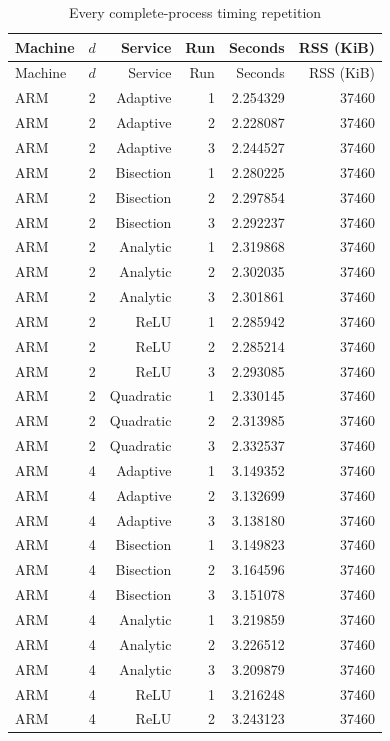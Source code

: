 {\small\setlength{\tabcolsep}{3pt}
\begin{longtable}{lrrrrr}
\caption{Every complete-process timing repetition}\label{tab:alltiming89}\\
\hline
Machine & $d$ & Service & Run & Seconds & RSS (KiB) \\
\hline
\endfirsthead
\hline
Machine & $d$ & Service & Run & Seconds & RSS (KiB) \\
\hline
\endhead
ARM & 2 & Adaptive & 1 & 2.254329 & 37460 \\
ARM & 2 & Adaptive & 2 & 2.228087 & 37460 \\
ARM & 2 & Adaptive & 3 & 2.244527 & 37460 \\
ARM & 2 & Bisection & 1 & 2.280225 & 37460 \\
ARM & 2 & Bisection & 2 & 2.297854 & 37460 \\
ARM & 2 & Bisection & 3 & 2.292237 & 37460 \\
ARM & 2 & Analytic & 1 & 2.319868 & 37460 \\
ARM & 2 & Analytic & 2 & 2.302035 & 37460 \\
ARM & 2 & Analytic & 3 & 2.301861 & 37460 \\
ARM & 2 & ReLU & 1 & 2.285942 & 37460 \\
ARM & 2 & ReLU & 2 & 2.285214 & 37460 \\
ARM & 2 & ReLU & 3 & 2.293085 & 37460 \\
ARM & 2 & Quadratic & 1 & 2.330145 & 37460 \\
ARM & 2 & Quadratic & 2 & 2.313985 & 37460 \\
ARM & 2 & Quadratic & 3 & 2.332537 & 37460 \\
ARM & 4 & Adaptive & 1 & 3.149352 & 37460 \\
ARM & 4 & Adaptive & 2 & 3.132699 & 37460 \\
ARM & 4 & Adaptive & 3 & 3.138180 & 37460 \\
ARM & 4 & Bisection & 1 & 3.149823 & 37460 \\
ARM & 4 & Bisection & 2 & 3.164596 & 37460 \\
ARM & 4 & Bisection & 3 & 3.151078 & 37460 \\
ARM & 4 & Analytic & 1 & 3.219859 & 37460 \\
ARM & 4 & Analytic & 2 & 3.226512 & 37460 \\
ARM & 4 & Analytic & 3 & 3.209879 & 37460 \\
ARM & 4 & ReLU & 1 & 3.216248 & 37460 \\
ARM & 4 & ReLU & 2 & 3.243123 & 37460 \\

\end{longtable}}
